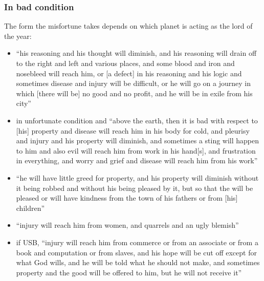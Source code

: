 \subsubsection{In bad condition}
The form the misfortune takes depends on which planet is acting as the lord of the year:
\begin{itemize}[topsep=0em,itemsep=0em]
\item[\Mars] ``his reasoning and his thought will diminish, and his reasoning will drain off to the right and left and various places, and some blood and iron and nosebleed will reach him, or [a defect] in his reasoning and his logic and sometimes disease and injury will be difficult, or he will go on a journey in which [there will be] no good and no profit, and he will be in exile from his city''

\item[\Saturn]  in unfortunate condition and ``above the earth, then it is bad with respect to [his] property and disease will reach him in his body for cold, and pleurisy and injury and his property will diminish, and sometimes a sting will happen to him and also evil will reach him from work in his hand[s], and frustration in everything, and worry and grief and disease will reach him from his work''

\item[\Jupiter]  ``he will have little greed for property, and his property will diminish without it being robbed and without his being pleased by it, but so that the will be pleased or will have kindness from the town of his fathers or from [his] children''

\item[\Venus]  ``injury will reach him from women, and quarrels and an ugly blemish''

\item[\Mercury]  if USB, ``injury will reach him from commerce or from an associate or from a book and computation or from slaves, and his hope will be cut off except for what God wills, and he will be told what he should not make, and sometimes property and the good will be offered to him, but he will not receive it''
\end{itemize}

